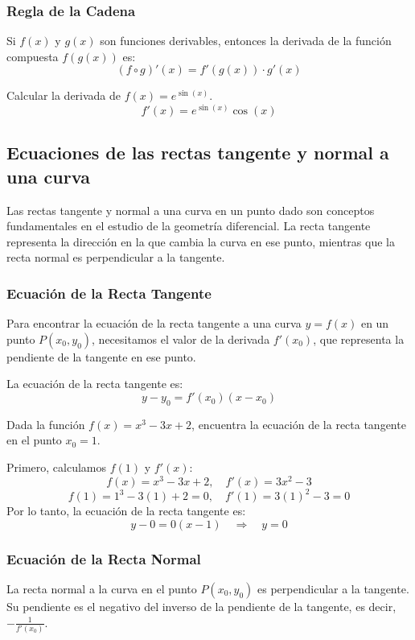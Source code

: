 \subsubsection{Regla de la Cadena}
Si $f(x)$ y $g(x)$ son funciones derivables, entonces la derivada de la función compuesta $f(g(x))$ es:
\begin{equation}
    (f \circ g)'(x) = f'(g(x)) \cdot g'(x)
\end{equation}
\begin{example}
    Calcular la derivada de $f(x) = e^{\sin(x)}$.
\[
f'(x) = e^{\sin(x)}\cos(x)
\]
\end{example}


\subsection{Ecuaciones de las rectas tangente y normal a una curva}

Las rectas tangente y normal a una curva en un punto dado son conceptos fundamentales en el estudio de la geometría diferencial. La recta tangente representa la dirección en la que cambia la curva en ese punto, mientras que la recta normal es perpendicular a la tangente.

\subsubsection{Ecuación de la Recta Tangente}
Para encontrar la ecuación de la recta tangente a una curva $y = f(x)$ en un punto $P(x_0, y_0)$, necesitamos el valor de la derivada $f'(x_0)$, que representa la pendiente de la tangente en ese punto.

La ecuación de la recta tangente es:
\begin{equation}
    y - y_0 = f'(x_0)(x - x_0)
\end{equation}

\begin{example}
Dada la función $f(x) = x^3 - 3x + 2$, encuentra la ecuación de la recta tangente en el punto $x_0 = 1$.

Primero, calculamos $f(1)$ y $f'(x)$:
\[
f(x) = x^3 - 3x + 2, \quad f'(x) = 3x^2 - 3
\]
\[
f(1) = 1^3 - 3(1) + 2 = 0, \quad f'(1) = 3(1)^2 - 3 = 0
\]
Por lo tanto, la ecuación de la recta tangente es:
\[
y - 0 = 0(x - 1) \quad \Rightarrow \quad y = 0
\]
\end{example}

\subsubsection{Ecuación de la Recta Normal}
La recta normal a la curva en el punto $P(x_0, y_0)$ es perpendicular a la tangente. Su pendiente es el negativo del inverso de la pendiente de la tangente, es decir, $-\frac{1}{f'(x_0)}$.

